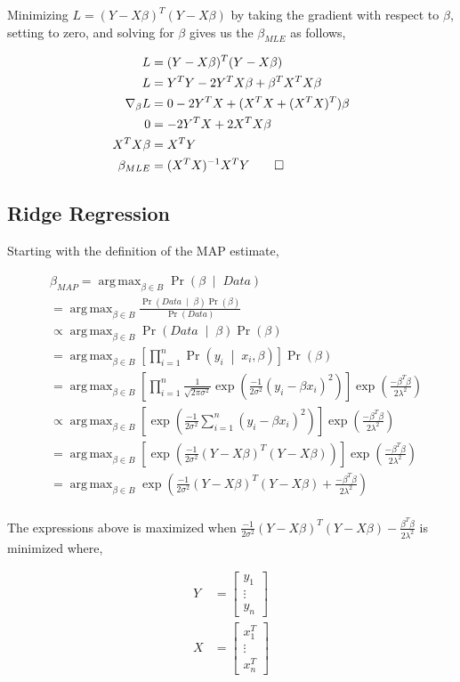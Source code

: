 \documentclass[letterpaper,10pt]{article} %
\newcommand{\pipe}{\;\middle\vert\;}
\newcommand{\condp}[2]{\Pr\left( #1 \pipe #2 \right)}
\newcommand{\pr}[1]{\Pr\left( #1 \right)}
\newcommand{\condpb}[2]{\frac{\condp{#2}{#1}\pr{#1}}{\pr{#2}}}
\DeclareMathOperator*{\argmax}{arg\,max}
\newcommand{\prove}[1]{
\begin{Proof}
\begin{align*}
#1
\end{align*}
\end{Proof}
}
\begin{document}
Minimizing $L=(Y-X\beta)^T(Y-X\beta)$ by taking the gradient with respect to $\beta$, setting to zero, and solving for $\beta$ gives us the $\beta_{MLE}$ as follows,

\prove{
L &= (Y-X\beta)^T(Y-X\beta) \\
L &= Y^TY -2Y^TX\beta+\beta^TX^TX\beta \\
\nabla_{\beta}L &= 0 - 2Y^TX + (X^TX +(X^TX)^T)\beta \\
0 &= -2Y^TX+2X^TX\beta \\
X^TX\beta &= X^TY \\
\beta_{MLE} &= (X^TX)^{-1}X^TY\qedhere
}

\subsection{Ridge Regression}

Starting with the definition of the MAP estimate,

\begin{align*}
&\beta_{MAP} = \argmax_{\beta \in B} \condp{\beta}{Data}\\
&= \argmax_{\beta \in B} \condpb{\beta}{Data}\\
&\propto \argmax_{\beta \in B} \condp{Data}{\beta}\pr{\beta}\\
&= \argmax_{\beta \in B} \left[ \prod_{i=1}^n \condp{y_i}{x_i, \beta}\right] \pr{\beta}\\
&= \argmax_{\beta \in B} \left[ \prod_{i=1}^n \frac{1}{\sqrt{2\pi\sigma^2}} \exp\left( \frac{-1}{2\sigma^2} (y_i-\beta x_i)^2 \right) \right] \exp\left(\frac{-\beta^T\beta}{2\lambda^2}\right)\\
&\propto \argmax_{\beta \in B} \left[ \exp\left( \frac{-1}{2\sigma^2} \sum_{i=1}^n (y_i-\beta x_i)^2 \right) \right] \exp\left(\frac{-\beta^T\beta}{2\lambda^2}\right)\\
&= \argmax_{\beta \in B} \left[ \exp\left( \frac{-1}{2\sigma^2} (Y-X\beta)^T(Y-X\beta) \right) \right] \exp\left(\frac{-\beta^T\beta}{2\lambda^2}\right)\\
&= \argmax_{\beta \in B} \exp\left( \frac{-1}{2\sigma^2} (Y-X\beta)^T(Y-X\beta) + \frac{-\beta^T\beta}{2\lambda^2}\right)\\
\end{align*}

The expressions above is maximized when $\frac{-1}{2\sigma^2}(Y-X\beta)^T(Y-X\beta)-\frac{\beta^T\beta}{2\lambda^2}$ is minimized where,

\begin{align*}
Y &= \left[ \begin{array}{c}
y_1 \\
\vdots \\
y_n \end{array} \right] \\
X &= \left[ \begin{array}{c}
x_1^T \\
\vdots \\
x_n^T \end{array} \right]
\end{align*}
\end{document}
